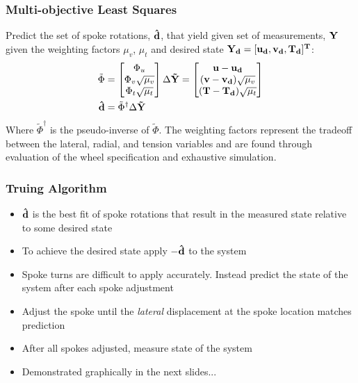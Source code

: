 \documentclass[mathserif]{beamer}
\begin{document}
\begin{frame}
\frametitle{Multi-objective Least Squares}
Predict the set of spoke rotations, $\bf \hat d$, that yield given set of measurements, $\bf Y$ given the weighting factors $\mu_v$, $\mu_t$ and desired state $\bf Y_d = [\bf u_d, v_d, T_d]^T$:
    \begin{align*}
    \tilde \Phi &= \begin{bmatrix}
    \Phi_u\\
    \Phi_v \sqrt {\mu_v}\\
    \Phi_t \sqrt {\mu_t}
    \end{bmatrix}
     \Delta \bf \tilde Y = \begin{bmatrix}
    \bf u - u_d \\
   ( {\bf v - v_d} )  \sqrt {\mu_v}\\
    ( {\bf  T - T_d} )  \sqrt {\mu_t}
    \end{bmatrix}  \\
        {\bf \hat d} &= \tilde \Phi^\dagger \Delta {\bf \tilde Y}
    \end{align*}
	Where $\tilde \Phi^\dagger$ is the pseudo-inverse of $\tilde \Phi$.  The weighting factors represent the tradeoff between the lateral, radial, and tension variables and are found through evaluation of the wheel specification and exhaustive simulation.
\end{frame}

\begin{frame}
        \frametitle{Truing Algorithm}
        \begin{itemize}
          \item $\bf \hat d$ is the best fit of spoke rotations that result in the measured state relative to some desired state
          \item To achieve the desired state apply $-\bf \hat d$ to the system
          \item Spoke turns are difficult to apply accurately.  Instead predict the state of the system after each spoke adjustment
          \item Adjust the spoke until the \emph{lateral} displacement at the spoke location matches prediction
          \item After all spokes adjusted, measure state of the system
          \item Demonstrated graphically in the next slides...
        \end{itemize}
\end{frame}

\end{document}
